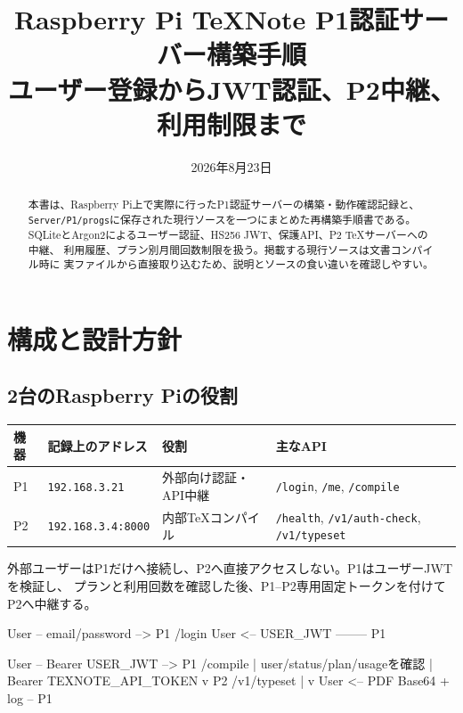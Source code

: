 \documentclass[uplatex,dvipdfmx,a4paper,11pt]{jsarticle}
\title{Raspberry Pi TeXNote P1認証サーバー構築手順\\
\large ユーザー登録からJWT認証、P2中継、利用制限まで}
\author{}
\date{2026年8月23日}
\begin{document}
\maketitle

\begin{abstract}
本書は、Raspberry Pi上で実際に行ったP1認証サーバーの構築・動作確認記録と、
\texttt{Server/P1/progs}に保存された現行ソースを一つにまとめた再構築手順書である。
SQLiteとArgon2によるユーザー認証、HS256 JWT、保護API、P2 TeXサーバーへの中継、
利用履歴、プラン別月間回数制限を扱う。掲載する現行ソースは文書コンパイル時に
実ファイルから直接取り込むため、説明とソースの食い違いを確認しやすい。
\end{abstract}

\tableofcontents
\newpage

\section{構成と設計方針}

\subsection{2台のRaspberry Piの役割}

\begin{longtable}{@{}p{18mm}p{37mm}p{50mm}p{45mm}@{}}
\toprule
機器 & 記録上のアドレス & 役割 & 主なAPI\\
\midrule
P1 & \texttt{192.168.3.21} & 外部向け認証・API中継 & \texttt{/login}, \texttt{/me}, \texttt{/compile}\\
P2 & \texttt{192.168.3.4:8000} & 内部TeXコンパイル & \texttt{/health}, \texttt{/v1/auth-check}, \texttt{/v1/typeset}\\
\bottomrule
\end{longtable}

外部ユーザーはP1だけへ接続し、P2へ直接アクセスしない。P1はユーザーJWTを検証し、
プランと利用回数を確認した後、P1--P2専用固定トークンを付けてP2へ中継する。

\begin{command}
User -- email/password --> P1 /login
User <-- USER_JWT -------- P1

User -- Bearer USER_JWT --> P1 /compile
                              | user/status/plan/usageを確認
                              | Bearer TEXNOTE_API_TOKEN
                              v
                         P2 /v1/typeset
                              |
                              v
User <-- PDF Base64 + log -- P1
\end{command}
\end{document}
